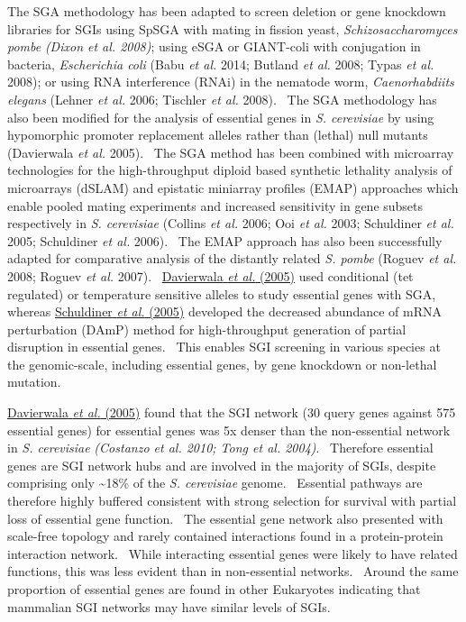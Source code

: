 The SGA methodology has been adapted to screen deletion or gene knockdown libraries for SGIs using SpSGA with mating in fission yeast, \textit{Schizosaccharomyces pombe }\textit{(Dixon et al. 2008)}; using eSGA or GIANT-coli with conjugation in bacteria, \textit{Escherichia coli} (Babu\textit{ et al.} 2014; Butland\textit{ et al.} 2008; Typas\textit{ et al.} 2008); or using RNA interference (RNAi) in the nematode worm, \textit{Caenorhabdiits elegans} (Lehner\textit{ et al.} 2006; Tischler\textit{ et al.} 2008). \ The SGA methodology has also been modified for the analysis of essential genes in \textit{S. cerevisiae} by using hypomorphic promoter replacement alleles rather than (lethal) null mutants (Davierwala\textit{ et al.} 2005). \ The SGA method has been combined with microarray technologies for the high-throughput diploid based synthetic lethality analysis of microarrays (dSLAM) and epistatic miniarray profiles (EMAP) approaches which enable pooled mating experiments and increased sensitivity in gene subsets respectively in \textit{S. cerevisiae} (Collins\textit{ et al.} 2006; Ooi\textit{ et al.} 2003; Schuldiner\textit{ et al.} 2005; Schuldiner\textit{ et al.} 2006). \ The EMAP approach has also been successfully adapted for comparative analysis of the distantly related \textit{S. pombe} (Roguev\textit{ et al.} 2008; Roguev\textit{ et al.} 2007). \ \hyperlink{ENREF28}{Davierwala}\hyperlink{ENREF28}{\textit{ et al.}}\hyperlink{ENREF28}{ (2005)} used conditional (tet regulated) or temperature sensitive alleles to study essential genes with SGA, whereas \hyperlink{ENREF87}{Schuldiner}\hyperlink{ENREF87}{\textit{ et al.}}\hyperlink{ENREF87}{ (2005)} developed the decreased abundance of mRNA perturbation (DAmP) method for high-throughput generation of partial disruption in essential genes. \ This enables SGI screening in various species at the genomic-scale, including essential genes, by gene knockdown or non-lethal mutation. \  

\hyperlink{ENREF28}{Davierwala}\hyperlink{ENREF28}{\textit{ et al.}}\hyperlink{ENREF28}{ (2005)} found that the SGI network (30 query genes against 575 essential genes) for essential genes was 5x denser than the non-essential network in \textit{S. cerevisiae }\textit{(Costanzo et al. 2010; Tong et al. 2004)}. \ Therefore essential genes are SGI network hubs and are involved in the majority of SGIs, despite comprising only \~{}18\% of the \textit{S. cerevisiae} genome. \ Essential pathways are therefore highly buffered consistent with strong selection for survival with partial loss of essential gene function. \ The essential gene network also presented with scale-free topology and rarely contained interactions found in a protein-protein interaction network. \ While interacting essential genes were likely to have related functions, this was less evident than in non-essential networks. \ Around the same proportion of essential genes are found in other Eukaryotes indicating that mammalian SGI networks may have similar levels of SGIs. \  

